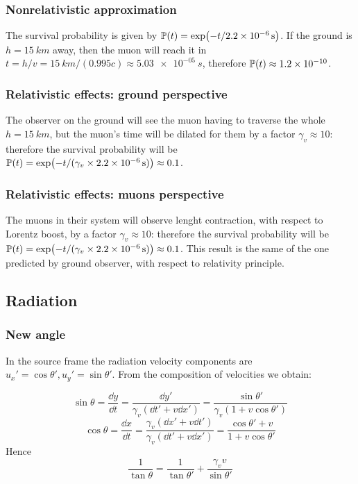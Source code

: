 \documentclass[main.tex]{subfiles}
\begin{document}
\subsubsection{Nonrelativistic approximation}

The survival probability is given by \(\mathbb{P} (t) = \exp(-t/ \SI{2.2e-6}{s})\). If the ground is \( h =\SI{15}{km} \) away, then the muon will reach it in \(t = h/v = \SI{15}{km} / (0.995c) \approx \SI{5.03e-05}{s}\), therefore \(\mathbb{P}(t) \approx \num{1.2e-10} \).

\subsubsection{Relativistic effects: ground perspective}

The observer on the ground will see the muon having to traverse the whole \(h = \SI{15}{km} \), but the muon's time will be dilated for them by a factor \(\gamma_v \approx 10\): therefore the survival probability
will be \(\mathbb{P}(t) = \exp(- t / (\gamma_v \times \SI{2.2e-6}{s})) \approx 0.1\).


\subsubsection{Relativistic effects: muons perspective}

The muons in their system will observe lenght contraction, with respect to Lorentz boost, by a factor \(\gamma_v \approx 10\): therefore the survival probability
will be \(\mathbb{P}(t) = \exp(- t / (\gamma_v \times \SI{2.2e-6}{s})) \approx 0.1\). This result is the same of the one predicted by ground observer, with respect to relativity principle.


\subsection{Radiation}

\subsubsection{New angle}
In the source frame the radiation velocity components are \( u_x' = \cos\theta', u_y' = \sin\theta' \). From the composition of velocities we obtain:

\[ \sin\theta = \frac{\dd{y}}{\dd{t}} = \frac{\dd{y'}}{\gamma_v(\dd{t'} + v\dd{x'})} = \frac{\sin\theta'}{\gamma_v(1+v\cos\theta')}\]
\[ \cos\theta = \frac{\dd{x}}{\dd{t}} = \frac{\gamma_v(\dd{x'} + v\dd{t'})}{\gamma_v(\dd{t'} + v\dd{x'})} = \frac{\cos\theta' + v}{1+v\cos\theta'}\]
Hence
\[ \frac{1}{\tan\theta} = \frac{1}{\tan\theta'} + \frac{\gamma_vv}{\sin\theta'} \]
\end{document}
